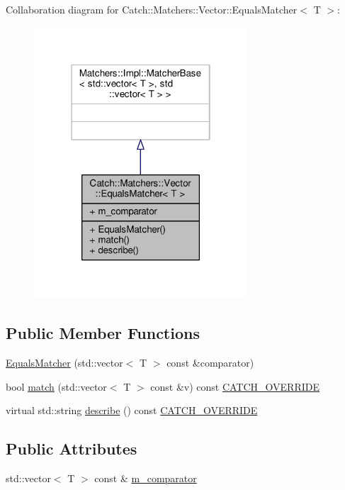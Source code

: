 Collaboration diagram for Catch\-:\-:Matchers\-:\-:Vector\-:\-:Equals\-Matcher$<$ T $>$\-:
\nopagebreak
\begin{figure}[H]
\begin{center}
\leavevmode
\includegraphics[width=226pt]{struct_catch_1_1_matchers_1_1_vector_1_1_equals_matcher__coll__graph}
\end{center}
\end{figure}
\subsection*{Public Member Functions}
\begin{DoxyCompactItemize}
\item 
\hyperlink{struct_catch_1_1_matchers_1_1_vector_1_1_equals_matcher_a3846c47780d1991dcfe87aefded98008}{Equals\-Matcher} (std\-::vector$<$ T $>$ const \&comparator)
\item 
bool \hyperlink{struct_catch_1_1_matchers_1_1_vector_1_1_equals_matcher_aca444c319d1b4c6f538faf9c4735da04}{match} (std\-::vector$<$ T $>$ const \&v) const \hyperlink{catch_8hpp_a8ecdce4d3f57835f707915ae831eb847}{C\-A\-T\-C\-H\-\_\-\-O\-V\-E\-R\-R\-I\-D\-E}
\item 
virtual std\-::string \hyperlink{struct_catch_1_1_matchers_1_1_vector_1_1_equals_matcher_aca79ade26f4a75b2a57005067e086e35}{describe} () const \hyperlink{catch_8hpp_a8ecdce4d3f57835f707915ae831eb847}{C\-A\-T\-C\-H\-\_\-\-O\-V\-E\-R\-R\-I\-D\-E}
\end{DoxyCompactItemize}
\subsection*{Public Attributes}
\begin{DoxyCompactItemize}
\item 
std\-::vector$<$ T $>$ const \& \hyperlink{struct_catch_1_1_matchers_1_1_vector_1_1_equals_matcher_a56f7aa6f110a12b1b9aeb0cabbc9d755}{m\-\_\-comparator}
\end{DoxyCompactItemize}


